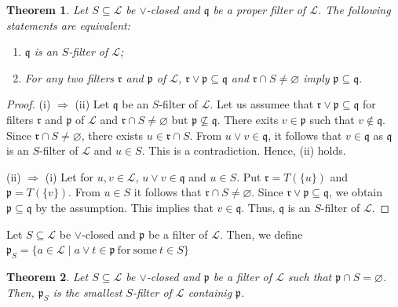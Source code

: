 \documentclass[preprint,review,10pt]{amsart}
\newtheorem{theorem}{Theorem}[section]
\theoremstyle{definition}
\theoremstyle{remark}
\numberwithin{equation}{section}
\begin{document}
\begin{theorem} \label{2}
Let $S \subseteq \mathscr{L}$ be   $\vee$-closed and $\mathfrak {q}$ be a proper filter of  $\mathscr{L}$.  The following statements are equivalent: 
\begin{enumerate} 
\item[(i)] $\mathfrak {q}$ is an $S$-filter of $\mathscr{L}$;
\item[(ii)] For any two filters $\mathfrak{r}$ and $\mathfrak{p}$  of $\mathscr{L}$, $\mathfrak{r} \vee \mathfrak{p} \subseteq \mathfrak{q}$ and $\mathfrak{r}  \cap S \neq \varnothing$ imply $\mathfrak{p} \subseteq \mathfrak{q}$. \end{enumerate}
\end{theorem}
\begin{proof}
(i) $\Longrightarrow$ (ii) Let $\mathfrak {q}$ be an $S$-filter of $\mathscr{L}$. Let us assumee that $\mathfrak{r} \vee \mathfrak{p} \subseteq \mathfrak{q}$ for filters  $\mathfrak{r}$ and $\mathfrak{p}$  of $\mathscr{L}$ and $\mathfrak{r}  \cap S \neq \varnothing$ but $\mathfrak{p} \nsubseteq \mathfrak{q}$. There exits $v \in \mathfrak{p}$ such that $v \notin \mathfrak{q}$. Since $\mathfrak{r}  \cap S \neq \varnothing$, there exists $u \in \mathfrak{r}  \cap S$. From $ u \vee v \in \mathfrak{q}$, it follows that $v \in \mathfrak{q}$ as $\mathfrak {q}$ is an $S$-filter of $\mathscr{L}$ and $u \in S$. This is a contradiction. Hence, (ii) holds.

(ii) $\Longrightarrow$ (i) Let for $u,v \in \mathscr{L}$,  $u \vee v \in \mathfrak {q}$  and $u \in S$. Put $\mathfrak{r}=T(\{u\})$ and $\mathfrak{p}=T(\{v\})$. From $u \in S$ it follows that $\mathfrak{r} \cap S \neq \varnothing$.  Since  $\mathfrak{r} \vee \mathfrak{p} \subseteq \mathfrak{q}$, we obtain $\mathfrak{p} \subseteq \mathfrak{q}$ by the assumption. This implies that $v \in \mathfrak{q}$. Thus, $\mathfrak {q}$ is an $S$-filter of $\mathscr{L}$.
\end{proof}
Let $S \subseteq \mathscr{L}$ be   $\vee$-closed and $\mathfrak{p}$ be a filter of $\mathscr{L}$. Then, we define $\mathfrak{p}_S=\{a \in \mathscr{L} \mid a \vee t \in \mathfrak{p} \  \mathrm{for\  some} \ t \in S\}$
\begin{theorem} \label{small}
Let $S \subseteq \mathscr{L}$ be   $\vee$-closed and $\mathfrak{p}$ be a filter of $\mathscr{L}$ such that $\mathfrak{p} \cap S=\varnothing$. Then, $\mathfrak{p}_S$  is the smallest $S$-filter of $\mathscr{L}$ containig $\mathfrak{p}$.
\end{theorem}
\end{document}
